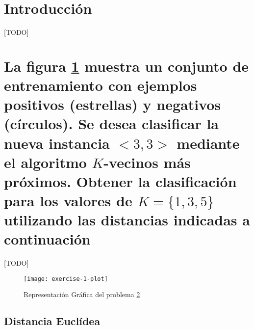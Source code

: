 \documentclass{article}
\begin{document}
	\maketitle %

	\thispagestyle{fancy} %



	\begin{abstract}
		\noindent [TODO ]
	\end{abstract}



	\section{Introducción}
	\label{sec:introducción}

		\paragraph{}
		[TODO]

	\section{La figura \ref{e1:plot} muestra un conjunto de entrenamiento con ejemplos positivos (estrellas) y negativos (círculos). Se desea clasificar la nueva instancia $<3,3>$ mediante el algoritmo $K$-vecinos más próximos. Obtener la clasificación para los valores de $K=\{ 1, 3, 5\}$ utilizando las distancias indicadas a continuación}
	\label{sec:e1}

		\paragraph{}
		[TODO]

		\begin{figure}[h]
			\begin{center}
				\texttt{[image: exercise-1-plot]}
			\end{center}
			\caption{Representación Gráfica del problema \ref{sec:e1}}
			\label{e1:plot}
		\end{figure}

		\subsection{Distancia Euclídea}
\end{document}
